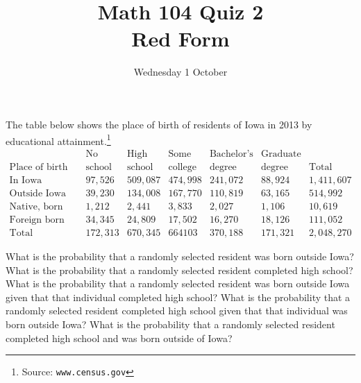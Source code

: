 \documentclass[12pt]{exam}
\title{Math 104 Quiz 2\\Red Form}
\date{Wednesday 1 October}
\begin{document}
\maketitle
\begin{center}
\end{center}

The table below shows the place of birth of residents of Iowa
in 2013 by educational attainment.\footnote{Source: \tt www.census.gov}
\[\begin{array}{r|lllll|l}
&\text{No high}&\text{High}&\text{Some}&\text{Bachelor's}&\text{Graduate}\\
\text{Place of birth}&\text{school}
&\text{school}&\text{college}&\text{degree}&\text{degree}&\text{Total}
\\\hline
\text{In Iowa}
&97,526&509,087&474,998&241,072&88,924&1,411,607\\
\text{Outside Iowa}
&39,230&134,008&167,770&110,819&63,165&514,992\\
\text{Native, born outside US}
&1,212&2,441&3,833&2,027&1,106&10,619\\
\text{Foreign born}
&34,345&24,809&17,502&16,270&18,126&111,052\\\hline
\text{Total}
&172,313&670,345&664103&370,188&171,321&2,048,270
\end{array}\]
\begin{questions}
\question What is the probability that a randomly selected
resident was born outside Iowa?
\question What is the probability that a randomly selected
resident completed high school?
\question What is the probability that a randomly selected
resident was born outside Iowa given that
that individual completed high school?
\question What is the probability that a randomly selected
resident completed high school given that
that individual was born outside Iowa?
\question What is the probability that a randomly selected
resident completed high school and was born
outside of Iowa?
\end{questions}
\end{document}

